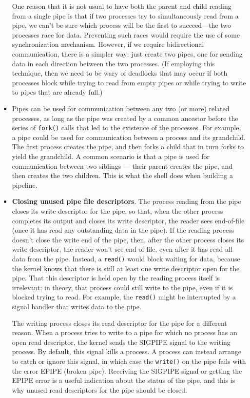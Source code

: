 \begin{itemize}
  One reason that it is not usual to have both the parent and child reading from a single
  pipe is that if two processes try to simultaneously read from a pipe, we can't be sure
  which process will be the first to succeed—the two processes race for data.  Preventing
  such races would require the use of some synchronization mechanism.  However, if we
  require bidirectional communication, there is a simpler way: just create two pipes, one
  for sending data in each direction between the two processes.  (If employing this
  technique, then we need to be wary of deadlocks that may occur if both processes block
  while trying to read from empty pipes or while trying to write to pipes that are already
  full.) 
\item Pipes can be used for communication between any two (or more) related processes, as
  long as the pipe was created by a common ancestor before the series of \texttt{fork()}
  calls that led to the existence of the processes. For example, a pipe could be used for
  communication between a process and its grandchild. The first process creates the pipe,
  and then forks a child that in turn forks to yield the grandchild. A common scenario is
  that a pipe is used for communication between two siblings --- their parent creates the
  pipe, and then creates the two children. This is what the shell does when building a
  pipeline.
\item \textbf{Closing unused pipe file descriptors}. The process reading from the pipe
  closes its write descriptor for the pipe, so that, when the other process completes its
  output and closes its write descriptor, the reader sees end-of-file (once it has read
  any outstanding data in the pipe).  If the reading process doesn't close the write end
  of the pipe, then, after the other process closes its write descriptor, the reader won't
  see end-of-file, even after it has read all data from the pipe. Instead, a
  \texttt{read()} would block waiting for data, because the kernel knows that there is
  still at least one write descriptor open for the pipe. That this descriptor is held open
  by the reading process itself is irrelevant; in theory, that process could still write
  to the pipe, even if it is blocked trying to read.  For example, the \texttt{read()}
  might be interrupted by a signal handler that writes data to the pipe.

  The writing process closes its read descriptor for the pipe for a different reason.
  When a process tries to write to a pipe for which no process has an open read
  descriptor, the kernel sends the SIGPIPE signal to the writing process. By default, this
  signal kills a process. A process can instead arrange to catch or ignore this signal, in
  which case the \texttt{write()} on the pipe fails with the error EPIPE (broken
  pipe). Receiving the SIGPIPE signal or getting the EPIPE error is a useful indication
  about the status of the pipe, and this is why unused read descriptors for the pipe
  should be closed.


\end{itemize}
